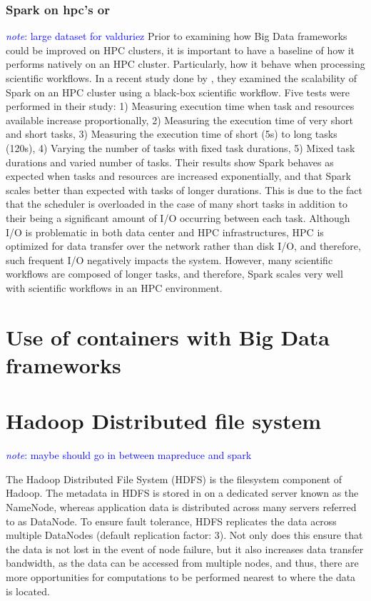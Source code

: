\documentclass{report}
\newcommand{\note}[1]{\textcolor{blue}{\textit{note}: #1}}
\begin{document}
        \subsubsection{Spark on hpc's or } \note{large dataset for valduriez} 
            Prior to examining how Big Data frameworks could be improved on HPC 
            clusters, it is important to have a baseline of how it performs 
            natively on an HPC cluster.  Particularly, how it behave when
            processing scientific workflows. In a recent study done by 
            \cite{valduriez}, they examined the scalability of Spark on an HPC 
            cluster using a black-box scientific workflow. Five tests were 
            performed in their study: 1) Measuring execution time when task and 
            resources available increase proportionally, 2) Measuring the 
            execution time of very short and short tasks, 3) Measuring the
            execution time of short (5s) to long tasks (120s), 4) Varying the 
            number of tasks with fixed task durations, 5) Mixed task durations 
            and varied number of tasks. Their results show Spark behaves as 
            expected when tasks and resources are increased exponentially, and 
            that Spark scales better than expected with tasks of longer 
            durations. This is due to the fact that the scheduler is overloaded 
            in the case of many short tasks in addition to their being a 
            significant amount of I/O occurring between each task. Although I/O
            is problematic in both data center and HPC infrastructures, HPC is 
            optimized for data transfer over the network rather than disk I/O, 
            and therefore, such frequent I/O negatively impacts the system. 
            However, many scientific workflows are composed of longer tasks, 
            and therefore, Spark scales very well with scientific workflows in 
            an HPC environment.  
    \section{Use of containers with Big Data frameworks} 
    \section{Hadoop Distributed file system} 
        \note{maybe should go in between mapreduce and spark} 

        The Hadoop Distributed File System (HDFS)\cite{hadoop} is the filesystem
        component of Hadoop. The metadata in HDFS is stored in on a dedicated
        server known as the NameNode, whereas application data is distributed
        across many servers referred to as DataNode. To ensure fault tolerance,
        HDFS replicates the data across multiple DataNodes (default replication
        factor: 3). Not only does this ensure that the data is not lost in the
        event of node failure, but it also increases data transfer bandwidth, as
        the data can be accessed from multiple nodes, and thus, there are more
        opportunities for computations to be performed nearest to where the data
        is located. 
\end{document}
